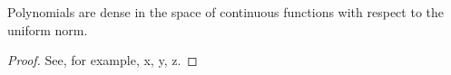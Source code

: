 % 

\begin{thm}

Polynomials are dense in the space of continuous functions with respect to the uniform norm.

\label{thm:Weierstrass}
\end{thm}

\begin{proof}
	See, for example, x, y, z.
\end{proof}


\endinput  %
